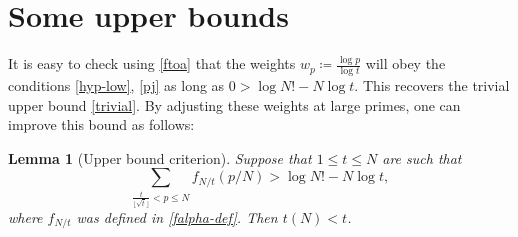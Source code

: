 \documentclass[12pt,a4paper,reqno]{amsart}
\numberwithin{equation}{section}
\theoremstyle{plain}
\newtheorem{lemma}[theorem]{Lemma}
\theoremstyle{definition}
\begin{document}
\section{Some upper bounds}\label{upper-sec}

It is easy to check using \eqref{ftoa} that the weights $w_p \coloneqq \frac{\log p}{\log t}$ will obey the conditions \eqref{hyp-low}, \eqref{pj} as long as $0 > \log N! - N \log t$.  This recovers the trivial upper bound \eqref{trivial}.  By adjusting these weights at large primes, one can improve this bound as follows:

\begin{lemma}[Upper bound criterion]\label{upper-crit}  Suppose that $1 \leq t \leq N$ are such that
  \begin{equation}\label{contra}
     \sum_{\frac{t}{\lfloor\sqrt{t}\rfloor} < p \leq N} f_{N/t}(p/N) > \log N! - N \log t,
  \end{equation}
  where $f_{N/t}$ was defined in \eqref{falpha-def}.
  Then $t(N) < t$.
  \end{lemma}
\end{document}
